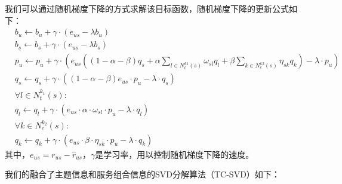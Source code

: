 \documentclass[master,winfonts]{njuthesis}
\begin{document}
我们可以通过随机梯度下降的方式求解该目标函数，随机梯度下降的更新公式如下：
\begin{equation}
\begin{split} 
& b_u\leftarrow  b_u+\gamma\cdot (e_{us}-\lambda b_u)\\
& b_s\leftarrow  b_s+\gamma\cdot (e_{us}-\lambda b_s)\\
& p_u\leftarrow  p_u+\gamma\cdot (e_{us}((1-\alpha-\beta)q_s+\alpha \sum \limits_{l \in N^{k1}_t(s)} \omega_{sl}q_l+\beta \sum \limits_{k \in N^{k2}_c(s)} \eta_{sk}q_k)-\lambda \cdot p_u)\\
& q_s\leftarrow  q_s+\gamma\cdot ((1-\alpha-\beta)e_{us}\cdot p_u-\lambda \cdot q_s)\\
& \forall l \in N^{k_1}_t(s):\\
& q_l\leftarrow  q_l+\gamma\cdot (e_{us}\cdot \alpha\cdot \omega_{sl}\cdot p_u-\lambda \cdot q_l)\\
& \forall k \in N^{k_2}_c(s):\\
& q_k\leftarrow  q_k+\gamma\cdot (e_{us}\cdot \beta\cdot \eta_{sk}\cdot p_u-\lambda \cdot q_k)
\end{split}
\end{equation}
其中，$e_{us} = r_{us}-\hat{r}_{us}$，$\gamma$是学习率，用以控制随机梯度下降的速度。

我们的融合了主题信息和服务组合信息的SVD分解算法（TC-SVD）如下：
\end{document}
